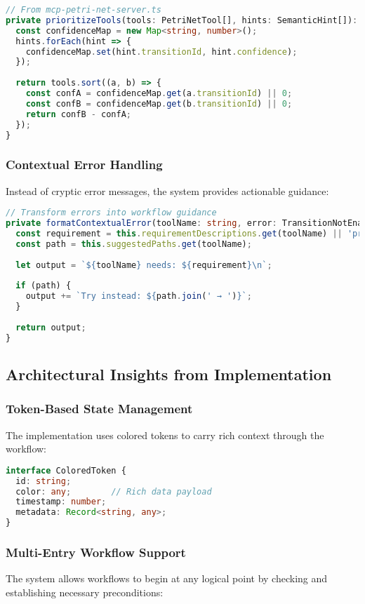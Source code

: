\documentclass[11pt,a4paper]{article}
\begin{document}
\begin{lstlisting}[language=TypeScript]
// From mcp-petri-net-server.ts
private prioritizeTools(tools: PetriNetTool[], hints: SemanticHint[]): any[] {
  const confidenceMap = new Map<string, number>();
  hints.forEach(hint => {
    confidenceMap.set(hint.transitionId, hint.confidence);
  });
  
  return tools.sort((a, b) => {
    const confA = confidenceMap.get(a.transitionId) || 0;
    const confB = confidenceMap.get(b.transitionId) || 0;
    return confB - confA;
  });
}
\end{lstlisting}

\subsubsection{Contextual Error Handling}
Instead of cryptic error messages, the system provides actionable guidance:

\begin{lstlisting}[language=TypeScript]
// Transform errors into workflow guidance
private formatContextualError(toolName: string, error: TransitionNotEnabledError): string {
  const requirement = this.requirementDescriptions.get(toolName) || 'prerequisites';
  const path = this.suggestedPaths.get(toolName);
  
  let output = `${toolName} needs: ${requirement}\n`;
  
  if (path) {
    output += `Try instead: ${path.join(' → ')}`;
  }
  
  return output;
}
\end{lstlisting}

\subsection{Architectural Insights from Implementation}

\subsubsection{Token-Based State Management}
The implementation uses colored tokens to carry rich context through the workflow:

\begin{lstlisting}[language=TypeScript]
interface ColoredToken {
  id: string;
  color: any;        // Rich data payload
  timestamp: number;
  metadata: Record<string, any>;
}
\end{lstlisting}

\subsubsection{Multi-Entry Workflow Support}
The system allows workflows to begin at any logical point by checking and establishing necessary preconditions:
\end{document}
